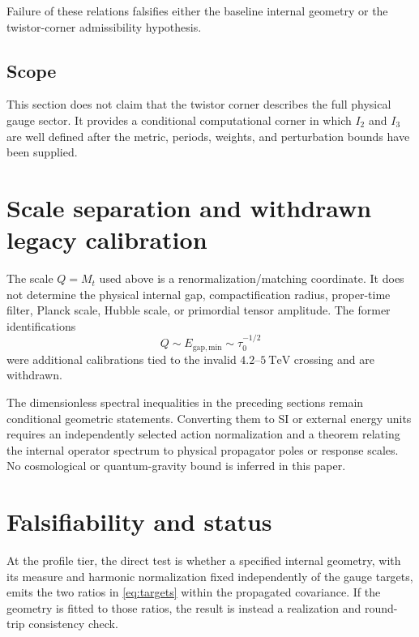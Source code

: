 \documentclass[11pt]{article}
\begin{document}
\begin{remark}
Failure of these relations falsifies either the baseline internal geometry
or the twistor-corner admissibility hypothesis.
\end{remark}

\subsection{Scope}

This section does not claim that the twistor corner describes the full
physical gauge sector. It provides a conditional computational corner in which
$I_2$ and $I_3$ are well defined after the metric, periods, weights, and
perturbation bounds have been supplied.


\section{Scale separation and withdrawn legacy calibration}

The scale $Q=M_t$ used above is a renormalization/matching coordinate.  It does
not determine the physical internal gap, compactification radius, proper-time
filter, Planck scale, Hubble scale, or primordial tensor amplitude.  The former
identifications
\[
 Q\sim E_{\mathrm{gap,min}}\sim\tau_0^{-1/2}
\]
were additional calibrations tied to the invalid $4.2$--$5~\mathrm{TeV}$
crossing and are withdrawn.

The dimensionless spectral inequalities in the preceding sections remain
conditional geometric statements.  Converting them to SI or external energy
units requires an independently selected action normalization and a theorem
relating the internal operator spectrum to physical propagator poles or
response scales.  No cosmological or quantum-gravity bound is inferred in this
paper.


\section{Falsifiability and status}

At the profile tier, the direct test is whether a specified internal geometry,
with its measure and harmonic normalization fixed independently of the gauge
targets, emits the two ratios in \eqref{eq:targets} within the propagated
covariance.  If the geometry is fitted to those ratios, the result is instead
a realization and round-trip consistency check.
\end{document}
